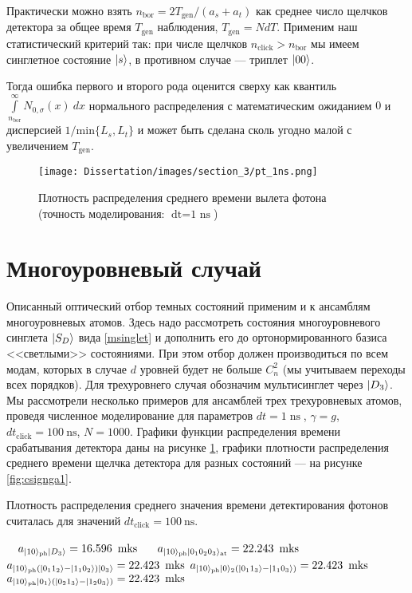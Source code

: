 Практически можно взять $n_{\text{bor}} = 2T_{\text{gen}}/(a_{s} + a_{t})$ как среднее число щелчков детектора за общее время $T_{\text{gen}}$ наблюдения, $T_{\text{gen}}=NdT$. Применим наш статистический критерий так: при числе щелчков $n_{\text{click}}>n_{\text{bor}}$ мы имеем синглетное состояние $|s\rangle$, в противном случае --- триплет $|00\rangle$. 

Тогда ошибка первого и второго рода оценится сверху как квантиль $\int\limits_{n_{\text{bor}}}^\infty N_{0,\sigma}(x)\ dx$ нормального распределения с математическим ожиданием $0$ и дисперсией $1/\text{min}\{L_s,L_t\}$ и может быть сделана сколь угодно малой с увеличением $T_{\text{gen}}$.

\begin{figure}[ht!]
	\noindent\centering\texttt{[image: Dissertation/images/section\_3/pt\_1ns.png]}
	\caption{
		Плотность распределения среднего времени вылета фотона\\
		(точность моделирования: $\mathop{dt = 1~\text{ns}}$)
	}
	\label{fig:csignga}
\end{figure}

\section{Многоуровневый случай}\label{sec:ch3/sect4}
Описанный оптический отбор темных состояний применим и к ансамблям многоуровневых атомов. Здесь надо рассмотреть состояния многоуровневого синглета $|S_{D}\rangle$ вида \eqref{msinglet}
и дополнить его до ортонормированного базиса <<светлыми>> состояниями. При этом отбор должен производиться по всем модам, которых в случае $d$ уровней будет не больше $C^{2}_{n}$ (мы учитываем переходы всех порядков). Для трехуровнего случая обозначим мультисинглет через $|D_3\rangle$. Мы рассмотрели несколько примеров для ансамблей трех трехуровневых атомов, проведя численное моделирование для параметров $dt = 1 \mathop{\text{ns}}$, $\gamma = g$, $dt_{\mathop{\text{click}}}=100\ \text{ns}$, $N = 1000$. 
Графики функции распределения времени срабатывания детектора даны на рисунке \ref{fig:csignga}, графики плотности распределения среднего времени щелчка детектора для разных состояний --- на рисунке \ref{fig:csignga1}.

Плотность распределения среднего значения времени детектирования фотонов считалась для значений 
$dt_{\mathop{\text{click}}} = 100~\text{ns}$.
\begin{flushleft}
	\qquad\qquad~~$a_{|10\ra_{\text{ph}}|D_3\ra} = 16.596\ \mathop{\text{mks}}$ \qquad\qquad\qquad~~ $a_{|10\rangle_{\text{ph}}|0_{1}0_{2}0_{3}\rangle_{\text{at}}} = 22.243\ \mathop{\text{mks}}$\\
	$a_{|10\rangle_{\text{ph}}(|0_{1}1_{2}\rangle-|1_{1}0_{2}\rangle)|0_{3}\rangle} = 22.423\ \mathop{\text{mks}}$ \qquad\qquad $a_{|10\rangle_{\text{ph}}|0\rangle_{2}(|0_{1}1_{3}\rangle-|1_{1}0_{3}\rangle)} = 22.423\ \mathop{\text{mks}}$\\ 
	$a_{|10\rangle_{\text{ph}}|0_{1}\rangle(|0_{2}1_{3}\rangle-|1_{2}0_{3}\rangle)} = 22.423\ \mathop{\text{mks}}$
\end{flushleft}

